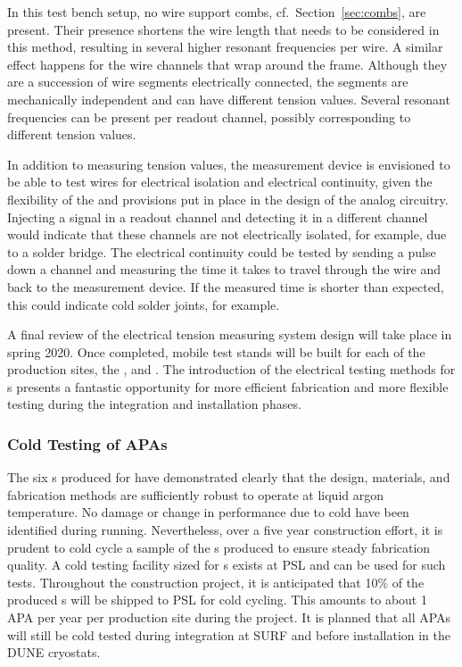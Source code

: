 In this test bench setup, no wire support combs, cf.\ Section~\ref{sec:combs}, are present. Their presence shortens the wire length that needs to be considered in this method, resulting in several higher resonant frequencies per wire. A similar effect happens for the wire channels that wrap around the  frame. Although they are a succession of wire segments electrically connected, the segments are mechanically independent and can have different tension values. Several resonant frequencies can be present per readout channel, possibly corresponding to different tension values.

In addition to measuring tension values, the measurement device is envisioned to be able to test wires for electrical isolation and electrical continuity, given the flexibility of the  and provisions put in place in the design of the analog circuitry. Injecting a signal in a readout channel and detecting it in a different channel would indicate that these channels are not electrically isolated, for example, due to a solder bridge. The electrical continuity could be tested by sending a pulse down a channel and measuring the time it takes to travel through the wire and back to the measurement device.  If the measured time is shorter than expected, this could indicate cold solder joints, for example.

A final review of the electrical tension measuring system design will take place in spring 2020. Once completed, mobile  test stands will be built for each of the  production sites, the , and .  The introduction of the electrical testing methods for s presents a fantastic opportunity for more efficient  fabrication and more flexible testing during the integration and installation phases.    


\subsubsection{Cold Testing of APAs}
\label{sec:fdsp-apa-prod-coldtest}

The six s produced for  have demonstrated clearly that the  design, materials, and fabrication methods are sufficiently robust to operate at liquid argon temperature.  No damage or change in performance due to cold have been identified during  running.  Nevertheless, over a five year construction effort, it is prudent to cold cycle a sample of the s produced to ensure steady fabrication quality.  A cold testing facility sized for  s exists at PSL and can be used for such tests. Throughout the construction project, it is anticipated that 10\% of the produced s will be shipped to PSL for cold cycling.  This amounts to about 1 APA per year per production site during the project.  It is planned that all APAs will still be cold tested during integration at SURF and before installation in the DUNE cryostats.      



